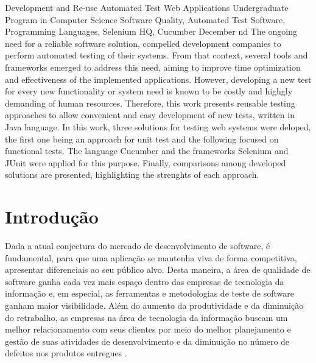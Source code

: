 \documentclass[tg]{mdtufsm}
\begin{document}
\begin{englishabstract}
{Development and Re-use Automated Test Web Applications}
{Undergraduate Program in Computer Science}
{Software Quality, Automated Test Software, Programming Languages, Selenium HQ, Cucumber}
{December}
{nd}
The ongoing need for a reliable software solution, compelled development companies to perform automated testing of their systems. From that context, several tools and frameworks emerged to address this need, aiming to improve time optimization and effectiveness of the implemented applications. However, developing a new test for every new functionality or system need is known to be costly and highgly demanding of human resources. Therefore, this work presents reusable testing approaches to allow convenient and easy development of new tests, written in Java language. In this work, three solutions for testing web systems were deloped, the first one being an approach for unit test and the following focused on functional tests. The language Cucumber and the frameworks Selenium and JUnit were applied for this purpose. Finally, comparisons among developed solutions are presented, highlighting the strenghts of each approach.
\end{englishabstract}

\tableofcontents
\listoffigures
\listoftables

\setlength{\baselineskip}{1.5\baselineskip}


\chapter{Introdução}

Dada a atual conjectura do mercado de desenvolvimento de software, é fundamental, para
que uma aplicação se mantenha viva de forma competitiva, apresentar diferenciais ao seu público alvo. Desta maneira, a área de qualidade de software ganha cada vez mais espaço dentro das empresas de tecnologia da informação e, em especial, as ferramentas e
metodologias de teste de software ganham maior visibilidade. Além do aumento da produtividade e da diminuição do retrabalho, as empresas na área de tecnologia da informação buscam um melhor relacionamento com seus clientes por meio do melhor planejamento e gestão de suas atividades de desenvolvimento e da diminuição no número de defeitos nos produtos entregues \cite{jomori2004qualidade}.
\end{document}

